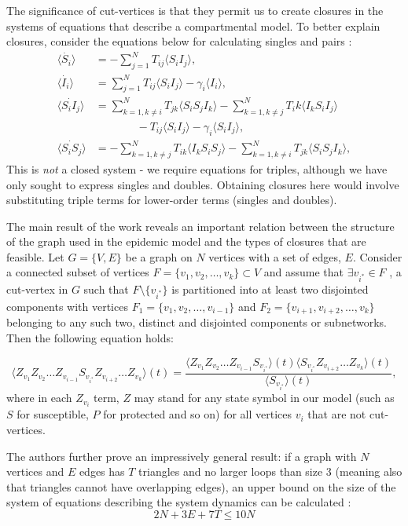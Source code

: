 \documentclass[../report.tex]{subfiles}
\begin{document}
The significance of cut-vertices is that they permit us to create closures in the systems of equations that describe a compartmental model. To better explain closures, consider the equations below for calculating singles and pairs \cite{kiss_2014}:
\begin{align*}
\langle \dot{S_i} \rangle & = -\sum^N_{j=1}T_{ij}\langle S_iI_j\rangle,\\
\langle\dot{I_i}\rangle & = \sum^N_{j=1}T_{ij}\langle S_iI_j\rangle - \gamma_i\langle I_i \rangle,\\
\langle\dot{S_iI_j}\rangle & = \sum^N_{k=1,k\neq i}T_{jk}\langle S_i S_j I_k \rangle - \sum^N_{k=1,k\neq j}T_ik\langle I_k S_i I_j \rangle \\ 
			    	      & ~~~~~~~~~~~~~~~~~- T_{ij}\langle S_iI_j \rangle - \gamma_i\langle S_i I_j \rangle,\\
\langle \dot{S_i S_j}\rangle & = - \sum^N_{k=1,k\neq j}T_{ik}\langle I_k S_i S_j \rangle - \sum^N_{k=1,k\neq i}T_{jk}\langle S_i S_j I_k \rangle,
\end{align*}
This is {\it not} a closed system - we require equations for triples, although we have only sought to express singles and doubles. Obtaining closures here would involve substituting triple terms for lower-order terms (singles and doubles).

The main result of the work reveals an important relation between the structure of the graph used in the epidemic model and the types of closures that are feasible. Let $G = \{V, E\}$ be a graph on $N$ vertices with a set of edges, $E$. Consider a connected subset of vertices $F = \{v_1, v_2, \dots, v_k\} \subset V$ and assume that $\exists v_{i^*} \in F$ , a cut-vertex in $G$ such that $F \setminus \{ v_{i^*} \}$ is partitioned into at least two disjointed components with vertices $F_1 = \{ v_1, v_2, \dots, v_{i-1} \}$ and $F_2 = \{ v_{i+1}, v_{i+2}, \dots, v_k \}$ belonging to any such two, distinct and disjointed components or subnetworks. Then the following equation holds:

$$
\langle Z_{v_1} Z_{v_2} \dots Z_{v_{i-1}} S_{v_{i^*}} Z_{v_{i+2}} \dots Z_{v_k} \rangle (t) = \frac{\langle Z_{v_1} Z_{v_2} \dots Z_{v_{i-1}} S_{v_{i^*}} \rangle (t) \langle S_{v_{i^*}} Z_{v_{i+2}} \dots Z_{v_k} \rangle (t)}{\langle S_{v_{i^*}} \rangle (t)},
$$
where in each $Z_{v_i}$ term, $Z$ may stand for any state symbol in our model (such as $S$ for susceptible, $P$ for protected and so on) for all vertices $v_i$ that are not cut-vertices.

The authors further prove an impressively general result: if a graph with $N$ vertices and  $E$ edges has $T$ triangles and no larger loops than size 3 (meaning also that triangles cannot have overlapping edges), an upper bound on the size of the system of equations describing the system dynamics can be calculated \cite{kiss_2014}:
$$
2N + 3E + 7T \leq 10N
$$
\end{document}
